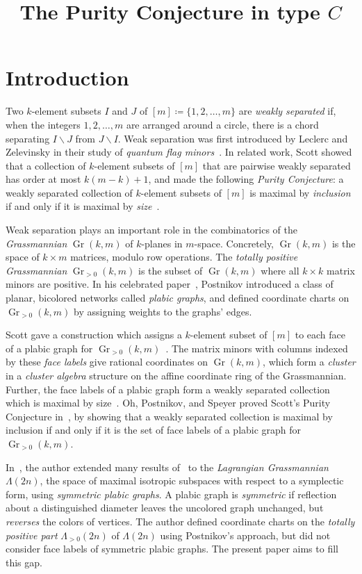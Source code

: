 \documentclass[ALCO,ThmDefs,Unicode,epreuves]{cedram}
\author{\firstname{Rachel} \lastname{Karpman}}
\title{The Purity Conjecture in type $C$}
\DeclareMathOperator{\Gr}{Gr}
\newcommand{\Lm}{\Lambda}
\begin{document}
\maketitle

\section{Introduction}

Two $k$-element subsets $I$ and $J$ of $[m] \coloneqq \{1,2,\ldots,m\}$ are \emph{weakly separated} if, when the integers $1,2,\ldots,m$ are arranged around a circle, there is a chord separating $I \backslash J$ from $J \backslash I$. Weak separation was first introduced by Leclerc and Zelevinsky in their study of \emph{quantum flag minors}~\cite{LZ98}. In related work, Scott showed that a collection of $k$-element subsets of $[m]$ that are pairwise weakly separated has order at most $k(m-k) + 1$, and made the following \emph{Purity Conjecture}: a weakly separated collection of $k$-element subsets of $[m]$ is maximal by \emph{inclusion} if and only if it is maximal by \emph{size}~\cite{JS05}.

Weak separation plays an important role in the combinatorics of the \emph{Grassmannian} $\Gr(k,m)$ of $k$-planes in $m$-space. Concretely, $\Gr(k,m)$ is the space of $k \times m$ matrices, modulo row operations. The \emph{totally positive Grassmannian} $\Gr_{>0}(k,m)$ is the subset of $\Gr(k,m)$ where all $k \times k$ matrix minors are positive. In his celebrated paper~\cite{Pos06}, Postnikov introduced a class of planar, bicolored networks called \emph{plabic graphs}, and defined coordinate charts on $\Gr_{>0}(k,m)$ by assigning weights to the graphs' edges. 

Scott gave a construction which assigns a $k$-element subset of $[m]$ to each face of a plabic graph for $\Gr_{>0}(k,m)$~\cite{JS06}. The matrix minors with columns indexed by these \emph{face labels} give rational coordinates on $\Gr(k,m)$, which form a \emph{cluster} in a \emph{cluster algebra} structure on the affine coordinate ring of the Grassmannian. Further, the face labels of a plabic graph form a weakly separated collection which is maximal by size~\cite{JS06}. Oh, Postnikov, and Speyer proved Scott's Purity Conjecture in~\cite{OPS15}, by showing that a weakly separated collection is maximal by inclusion if and only if it is the set of face labels of a plabic graph for $\Gr_{>0}(k,m)$.

In~\cite{Kar18}, the author extended many results of~\cite{Pos06} to the \emph{Lagrangian Grassmannian} $\Lm(2n)$, the space of maximal isotropic subspaces with respect to a symplectic form, using \emph{symmetric plabic graphs}. A plabic graph is \emph{symmetric} if reflection about a distinguished diameter leaves the uncolored graph unchanged, but \emph{reverses} the colors of vertices. The author defined coordinate charts on the \emph{totally positive part} $\Lm_{>0}(2n)$ of $\Lm(2n)$ using Postnikov's approach, but did not consider face labels of symmetric plabic graphs. The present paper aims to fill this gap.
\end{document}
